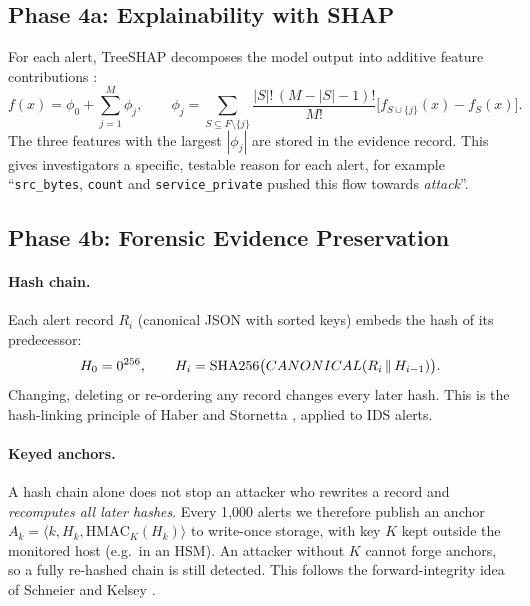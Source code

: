 \documentclass[12pt,a4paper,oneside]{article}
\renewcommand{\textsc}[1]{{\small\MakeUppercase{#1}}}
\begin{document}
\subsection{Phase 4a: Explainability with SHAP}
For each alert, TreeSHAP decomposes the model output into additive feature contributions \cite{lundberg2017unified,lundberg2020local}:
\begin{equation}
f(x)=\phi_0+\sum_{j=1}^{M}\phi_j,\qquad
\phi_j=\sum_{S\subseteq F\setminus\{j\}}\frac{|S|!\,(M-|S|-1)!}{M!}\Big[f_{S\cup\{j\}}(x)-f_S(x)\Big].
\end{equation}
The three features with the largest $|\phi_j|$ are stored in the evidence record. This gives investigators a specific, testable reason for each alert, for example ``\texttt{src\_bytes}, \texttt{count} and \texttt{service\_private} pushed this flow towards \emph{attack}''.

\subsection{Phase 4b: Forensic Evidence Preservation}\label{sec:forensic}
\paragraph{Hash chain.} Each alert record $R_i$ (canonical JSON with sorted keys) embeds the hash of its predecessor:
\begin{equation}
H_0 = 0^{256},\qquad H_i=\mathrm{SHA256}\big(\textsc{Canonical}(R_i \,\|\, H_{i-1})\big).
\end{equation}
Changing, deleting or re-ordering any record changes every later hash. This is the hash-linking principle of Haber and Stornetta \cite{haber1991time}, applied to IDS alerts.

\paragraph{Keyed anchors.} A hash chain alone does not stop an attacker who rewrites a record and \emph{recomputes all later hashes}. Every 1{,}000 alerts we therefore publish an anchor $A_k=\langle k, H_k, \mathrm{HMAC}_K(H_k)\rangle$ to write-once storage, with key $K$ kept outside the monitored host (e.g.\ in an HSM). An attacker without $K$ cannot forge anchors, so a fully re-hashed chain is still detected. This follows the forward-integrity idea of Schneier and Kelsey \cite{schneier1999secure}.
\end{document}
